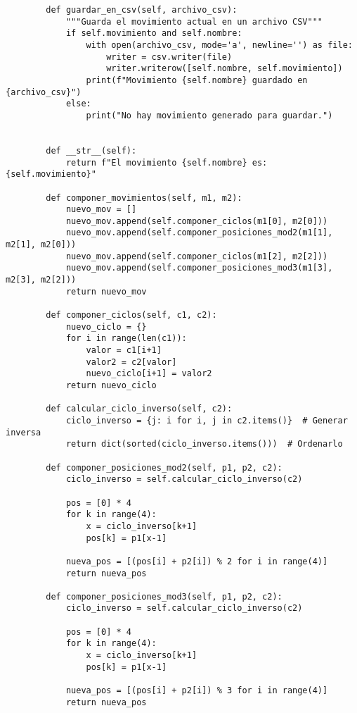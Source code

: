 \begin{lstlisting}
        def guardar_en_csv(self, archivo_csv):
            """Guarda el movimiento actual en un archivo CSV"""
            if self.movimiento and self.nombre:
                with open(archivo_csv, mode='a', newline='') as file:
                    writer = csv.writer(file)
                    writer.writerow([self.nombre, self.movimiento])
                print(f"Movimiento {self.nombre} guardado en {archivo_csv}")
            else:
                print("No hay movimiento generado para guardar.")
    
    
        def __str__(self):
            return f"El movimiento {self.nombre} es: {self.movimiento}"
        
        def componer_movimientos(self, m1, m2):
            nuevo_mov = []
            nuevo_mov.append(self.componer_ciclos(m1[0], m2[0]))
            nuevo_mov.append(self.componer_posiciones_mod2(m1[1], m2[1], m2[0]))
            nuevo_mov.append(self.componer_ciclos(m1[2], m2[2]))
            nuevo_mov.append(self.componer_posiciones_mod3(m1[3], m2[3], m2[2]))
            return nuevo_mov
            
        def componer_ciclos(self, c1, c2):
            nuevo_ciclo = {}
            for i in range(len(c1)):
                valor = c1[i+1]
                valor2 = c2[valor]
                nuevo_ciclo[i+1] = valor2
            return nuevo_ciclo
        
        def calcular_ciclo_inverso(self, c2):
            ciclo_inverso = {j: i for i, j in c2.items()}  # Generar inversa
            return dict(sorted(ciclo_inverso.items()))  # Ordenarlo
        
        def componer_posiciones_mod2(self, p1, p2, c2):
            ciclo_inverso = self.calcular_ciclo_inverso(c2)
    
            pos = [0] * 4
            for k in range(4):
                x = ciclo_inverso[k+1]
                pos[k] = p1[x-1]
    
            nueva_pos = [(pos[i] + p2[i]) % 2 for i in range(4)]
            return nueva_pos
    
        def componer_posiciones_mod3(self, p1, p2, c2):
            ciclo_inverso = self.calcular_ciclo_inverso(c2)
    
            pos = [0] * 4
            for k in range(4):
                x = ciclo_inverso[k+1]
                pos[k] = p1[x-1]
    
            nueva_pos = [(pos[i] + p2[i]) % 3 for i in range(4)]
            return nueva_pos
        

\end{lstlisting}
